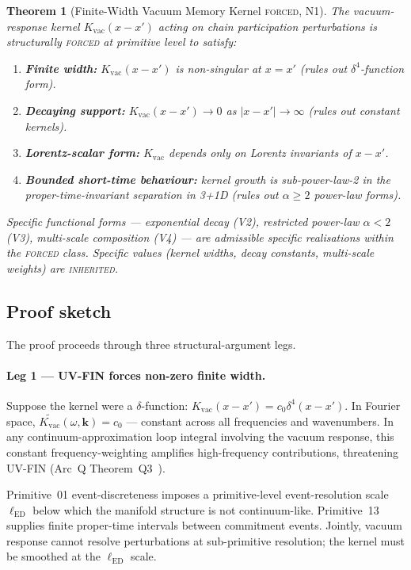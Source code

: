 \documentclass[11pt,a4paper]{article}
\newtheorem{theorem}{Theorem}[section]
\begin{document}
\begin{theorem}[Finite-Width Vacuum Memory Kernel \textsc{forced}, N1]
The vacuum-response kernel $K_\mathrm{vac}(x - x')$ acting on chain participation perturbations is structurally \textsc{forced} at primitive level to satisfy:
\begin{enumerate}
  \item[(i)] \textbf{Finite width:} $K_\mathrm{vac}(x - x')$ is non-singular at $x = x'$ (rules out $\delta^4$-function form).
  \item[(ii)] \textbf{Decaying support:} $K_\mathrm{vac}(x - x') \to 0$ as $|x - x'| \to \infty$ (rules out constant kernels).
  \item[(iii)] \textbf{Lorentz-scalar form:} $K_\mathrm{vac}$ depends only on Lorentz invariants of $x - x'$.
  \item[(iv)] \textbf{Bounded short-time behaviour:} kernel growth is sub-power-law-2 in the proper-time-invariant separation in 3+1D (rules out $\alpha \geq 2$ power-law forms).
\end{enumerate}
Specific functional forms --- exponential decay (V2), restricted power-law $\alpha < 2$ (V3), multi-scale composition (V4) --- are admissible specific realisations within the \textsc{forced} class. Specific values (kernel widths, decay constants, multi-scale weights) are \textsc{inherited}.
\end{theorem}

\subsection{Proof sketch}

The proof proceeds through three structural-argument legs.

\paragraph{Leg 1 --- UV-FIN forces non-zero finite width.}
Suppose the kernel were a $\delta$-function: $K_\mathrm{vac}(x - x') = c_0 \delta^4(x - x')$. In Fourier space, $\widetilde{K_\mathrm{vac}}(\omega, \mathbf{k}) = c_0$ --- constant across all frequencies and wavenumbers. In any continuum-approximation loop integral involving the vacuum response, this constant frequency-weighting amplifies high-frequency contributions, threatening UV-FIN (Arc~Q Theorem~Q3~\cite{arcq}).

Primitive~01 event-discreteness imposes a primitive-level event-resolution scale $\ell_\mathrm{ED}$ below which the manifold structure is not continuum-like. Primitive~13 supplies finite proper-time intervals between commitment events. Jointly, vacuum response cannot resolve perturbations at sub-primitive resolution; the kernel must be smoothed at the $\ell_\mathrm{ED}$ scale.
\end{document}
